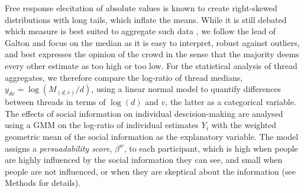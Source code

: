 \documentclass[9pt,a4paper,twocolumn,lineno]{article}
\begin{document}
Free response elecitation of absolute values is known to create right-skewed distributions with long tails, which inflate the means. While it is still debated which measure is best suited to aggregate such data \cite{kao2018counteracting}, we follow the lead of Galton \cite{galton1907vox} and focus on the median as it is easy to interpret, robust against outliers, and best expresses the opinion of the crowd in the sense that the majority deems every other estimate as too high or too low. For the statistical analysis of thread aggregates, we therefore compare the log-ratio of thread medians, $y_{dv}=\log(M_{(d,v)}/d)$, using a linear normal model to quantify differences between threads in terms of $\log(d)$ and $v$, the latter as a categorical variable. The effects of social information on individual descision-making are analysed using a GMM on the log-ratio of individual estimates $Y_i$ with the weighted geometric mean of the social information as the explanatory variable. %
The model assigns a \textit{persuadability score}, $\beta^w$, to each participant, which is high when people are highly influenced by the social information they can see, and small when people are not influenced, or when they are skeptical about the information (see Methods for details). 
\end{document}
